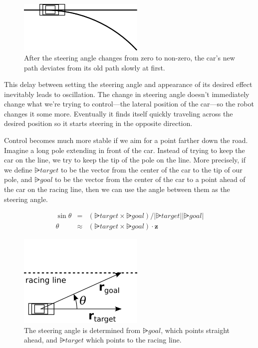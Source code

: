 \documentclass{article}
\begin{document}
\begin{figure}
  \centering
  \includegraphics[width=6cm]{steering-arc.png}  
  \caption{After the steering angle changes from zero to non-zero, the car's
    new path deviates from its old path slowly at first.} 
  \label{fig:steering-arc}
\end{figure}

This delay between setting the steering angle and appearance of its desired
effect inevitably leads to oscillation.  The change in steering angle doesn't
immediately change what we're trying to control---the lateral position of the
car---so the robot changes it some more.  Eventually it finds itself quickly
traveling across the desired position so it starts steering in the opposite
direction.

Control becomes much more stable if we aim for a point farther down the road.
Imagine a long pole extending in front of the car.  Instead of trying to keep
the car on the line, we try to keep the tip of the pole on the line.  More
precisely, if we define $\rsub{target}$ to be the vector from the center of the
car to the tip of our pole, and $\rsub{goal}$ to be the vector from the center
of the car to a point ahead of the car on the racing line, then we can use the
angle between them as the steering angle.

\begin{eqnarray}
  \sin \theta & = & (\rsub{target} \times
  \rsub{goal})/|\rsub{target}||\rsub{goal}| \\
  \theta & \approx &  (\rsub{target} \times \rsub{goal}) \cdot \mathbf{z}
\end{eqnarray}

\begin{figure}
  \centering
  \includegraphics[width=6cm]{steering-vectors.png}  
  \caption{The steering angle is determined from $\rsub{goal}$, which points
    straight ahead, and $\rsub{target}$ which points to the racing line.}
  \label{fig:steering-vectors}
\end{figure}
\end{document}
